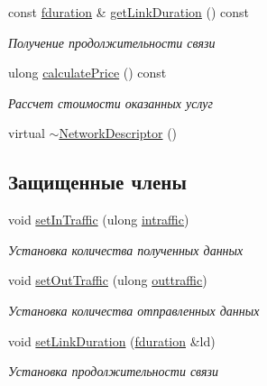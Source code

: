 \begin{DoxyCompactItemize}
const \hyperlink{networkservice_8h_a476cc728ef971cba9111c75ea41a760a}{fduration} \& \hyperlink{class_network_service_1_1_network_descriptor_a21523ecd4dfc2b54873cefd02bc1fb80}{get\+Link\+Duration} () const 
\begin{DoxyCompactList}\small\item\em Получение продолжительности связи \end{DoxyCompactList}\item 
ulong \hyperlink{class_network_service_1_1_network_descriptor_a515f9b5e56c7027101fcb000e9be96a2}{calculate\+Price} () const 
\begin{DoxyCompactList}\small\item\em Рассчет стоимости оказанных услуг \end{DoxyCompactList}\item 
virtual \hyperlink{class_network_service_1_1_network_descriptor_a2bdb0f0cc2aaec9cf58359f1598ea1ee}{$\sim$\+Network\+Descriptor} ()
\end{DoxyCompactItemize}
\subsection*{Защищенные члены}
\begin{DoxyCompactItemize}
\item 
void \hyperlink{class_network_service_1_1_network_descriptor_a93fd081bae34302f1ab259c2c33a8ea8}{set\+In\+Traffic} (ulong \hyperlink{class_network_service_1_1_network_descriptor_ac4fc85cab905739a9513fcfd06ca0453}{intraffic})
\begin{DoxyCompactList}\small\item\em Установка количества полученных данных \end{DoxyCompactList}\item 
void \hyperlink{class_network_service_1_1_network_descriptor_afaa15f0c88bb871378cbd65fc39449ab}{set\+Out\+Traffic} (ulong \hyperlink{class_network_service_1_1_network_descriptor_a109969d9199b67144184e1b296406edc}{outtraffic})
\begin{DoxyCompactList}\small\item\em Установка количества отправленных данных \end{DoxyCompactList}\item 
void \hyperlink{class_network_service_1_1_network_descriptor_aa72594b531998aba59d5586acdfab788}{set\+Link\+Duration} (\hyperlink{networkservice_8h_a476cc728ef971cba9111c75ea41a760a}{fduration} \&ld)
\begin{DoxyCompactList}\small\item\em Установка продолжительности связи \end{DoxyCompactList}\end{DoxyCompactItemize}
